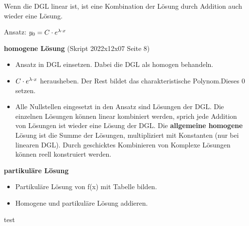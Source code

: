 
Wenn die DGL linear ist, ist eine Kombination der Lösung durch Addition auch wieder eine Lösung.

Ansatz: $y_0=C\cdot e^{\lambda \cdot x}$

\textbf{homogene Lösung} (Skript 2022x12x07 Seite 8)
\begin{itemize}
    \item Ansatz in DGL einsetzen. Dabei die DGL als homogen behandeln.
    \item $C\cdot e^{\lambda \cdot x}$ herausheben. Der Rest bildet das charakteristische Polynom.Dieses 0 setzen.
    \item Alle Nullstellen eingesetzt in den Ansatz sind Lösungen der DGL. Die einzelnen Lösungen können linear kombiniert werden, sprich jede Addition von Lösungen ist wieder eine Lösung der DGL. Die \textbf{allgemeine homogene} Lösung ist die Summe der Lösungen, multipliziert mit Konstanten (nur bei linearen DGL). Durch geschicktes Kombinieren von Komplexe Lösungen können reell konstruiert werden.
\end{itemize}

\textbf{partikuläre Lösung}
\begin{itemize}
    \item Partikuläre Lösung von f(x) mit Tabelle bilden.
    \item Homogene und partikuläre Lösung addieren.    
\end{itemize}

test


